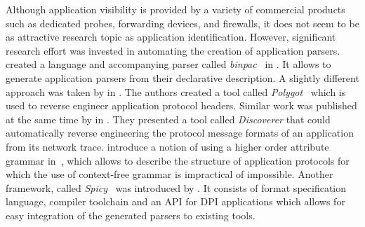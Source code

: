 Although application visibility is provided by a variety of commercial products such as dedicated probes, forwarding devices, and firewalls, it does not seem to be as attractive research topic as application identification. However, significant research effort was invested in automating the creation of application parsers. \citeauthor{Pang-2006-binpac} created a language and accompanying parser called \emph{binpac}~\cite{Pang-2006-binpac} in \citeyear{Pang-2006-binpac}. It allows to generate application parsers from their declarative description. A slightly different approach was taken by \citeauthor{Caballero-2007-Polyglot} in \citeyear{Caballero-2007-Polyglot}. The authors created a tool called \emph{Polygot}~\cite{Caballero-2007-Polyglot} which is used to reverse engineer application protocol headers. Similar work was published at the same time by \citeauthor{Cui-2007-Discoverer} in \cite{Cui-2007-Discoverer}. They presented a tool called \emph{Discoverer} that could automatically reverse engineering the protocol message formats of an application from its network trace. \citeauthor{Davidson-2009-Protocol} introduce a notion of using a higher order attribute grammar in~\cite{Davidson-2009-Protocol}, which allows to describe the structure of application protocols for which the use of context-free grammar is impractical of impossible. Another framework, called \emph{Spicy}~\cite{Sommer-2016-Spicy} was introduced by \citeauthor{Sommer-2016-Spicy}. It consists of format specification language, compiler toolchain and an API for DPI applications which allows for easy integration of the generated parsers to existing tools.





